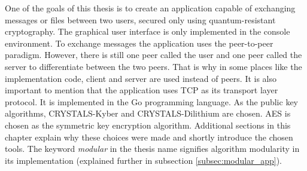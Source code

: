 One of the goals of this thesis is to create an application capable of exchanging messages or files between two users, secured only using quantum-resistant cryptography. The graphical user interface is only implemented in the console environment. To exchange messages the application uses the peer-to-peer paradigm. However, there is still one peer called the user and one peer called the server to differentiate between the two peers. That is why in some places like the implementation code, client and server are used instead of peers. It is also important to mention that the application uses TCP as its transport layer protocol. It is implemented in the Go programming language. As the public key algorithms, CRYSTALS-Kyber and CRYSTALS-Dilithium are chosen. AES is chosen as the symmetric key encryption algorithm. Additional sections in this chapter explain why these choices were made and shortly introduce the chosen tools. The keyword \textit{modular} in the thesis name signifies algorithm modularity in its implementation (explained further in subsection \ref{subsec:modular_app}).
